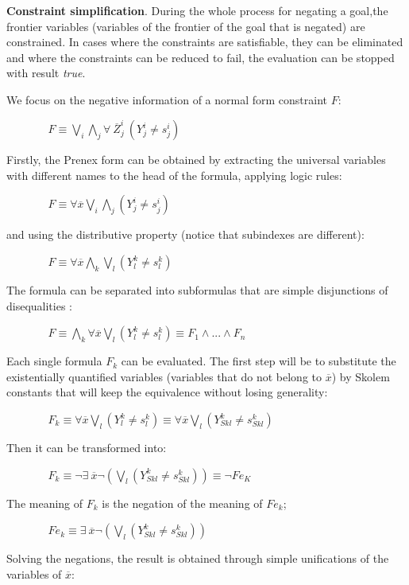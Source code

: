 \documentclass{tlp}
\begin{document}
\noindent
{\bf Constraint simplification}. During the whole process for negating
a goal,the frontier variables (variables of the frontier of the goal
that is negated) are constrained. In cases where the constraints are
satisfiable, they can be eliminated and where the constraints can be
reduced to fail, the evaluation can be stopped with result
\emph{true}.
 
We focus on the negative information of a normal form constraint $F$:

$~~~~~~~~~~~~~~~~~ F \equiv  \bigvee_i\bigwedge_j \forall~ \overline{Z}_j^i~(Y_j^i \neq s_j^i)$

Firstly, the Prenex form \cite{Shoenfield} can be obtained by
extracting the universal variables with different names to the head of
the formula, applying logic rules:

$~~~~~~~~~~~~~~~~~ F \equiv \forall \overline{x} \bigvee_i\bigwedge_j (Y_j^i \neq s_j^i) $

\noindent
and using the distributive property (notice that subindexes are different):

$~~~~~~~~~~~~~~~~~ F \equiv \forall \overline{x} \bigwedge_k\bigvee_l (Y_l^k \neq s_l^k) $

The formula can be separated into subformulas that are simple
disjunctions of disequalities :

 $~~~~~~~~~~~~~~~~~ F \equiv \bigwedge_k \forall \overline{x} \bigvee_l (Y_l^k \neq s_l^k) \equiv F_1 \wedge ... \wedge F_n$

Each single formula $F_k$ can be evaluated. The first step will be to
substitute the existentially quantified variables (variables that do not
belong to $\overline{x}$) by Skolem constants that will keep
the equivalence without losing generality:

$~~~~~~~~~~~~~~~~~  F_k \equiv \forall \overline{x} \bigvee_l ( Y_l^k \neq s_l^k ) \equiv \forall \overline{x} \bigvee_l ( Y_{Sk l}^k \neq s_{Sk l}^k )  $

Then it can be transformed into:

$~~~~~~~~~~~~~~~~~ F_k \equiv  \neg \exists ~ \overline{x} \neg ( \bigvee_l (Y_{Sk l}^k \neq s_{Sk l}^k) ) \equiv \neg Fe_K $

The meaning of $F_k$ is the negation of the meaning of $Fe_k$;

$~~~~~~~~~~~~~~~~~ Fe_k \equiv \exists ~ \overline{x} \neg ( \bigvee_l (Y_{Sk l}^k \neq s_{Sk l}^k)) $
 
Solving the negations, the result is obtained through simple unifications of the variables of $\overline{x}$:
\end{document}
